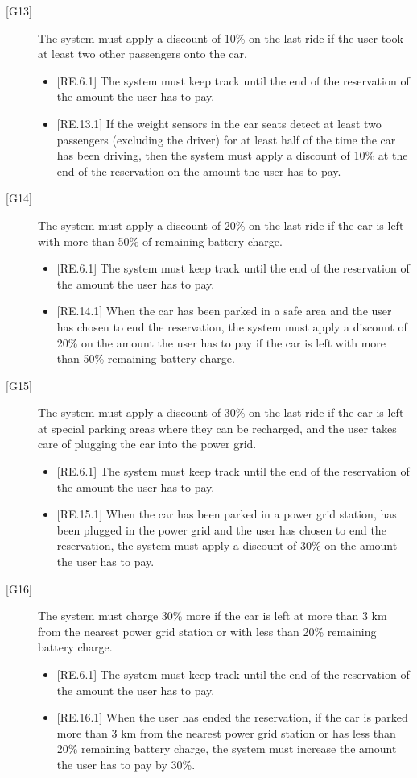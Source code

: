 \documentclass[english]{article}
\begin{document}
\begin{description}
\item[{[G13]}]{The system must apply a discount of 10\% on the last ride if the user took at least two other passengers onto the car.
\begin{itemize}
	\item{[RE.6.1] The system must keep track until the end of the reservation of the amount the user has to pay.}
	\item{[RE.13.1] If the weight sensors in the car seats detect at least two passengers (excluding the driver) for at least half of the time the car has been driving, then the system must apply a discount of 10\% at the end of the reservation on the amount the user has to pay.}
\end{itemize}
}

\item[{[G14]}]{The system must apply a discount of 20\% on the last ride if the car is left with more than 50\% of remaining battery charge.
\begin{itemize}
	\item{[RE.6.1] The system must keep track until the end of the reservation of the amount the user has to pay.}
	\item{[RE.14.1] When the car has been parked in a safe area and the user has chosen to end the reservation, the system must apply a discount of 20\% on the amount the user has to pay if the car is left with more than 50\% remaining battery charge.}
\end{itemize}
}

\item[{[G15]}]{The system must apply a discount of 30\% on the last ride if the car is left at special parking areas where they can be recharged, and the user takes care of plugging the car into the power grid.
\begin{itemize}
	\item{[RE.6.1] The system must keep track until the end of the reservation of the amount the user has to pay.}
	\item{[RE.15.1] When the car has been parked in a power grid station, has been plugged in the power grid and the user has chosen to end the reservation, the system must apply a discount of 30\% on the amount the user has to pay.}
\end{itemize}
}

\item[{[G16]}]{The system must charge 30\% more if the car is left at more than 3 km from the nearest power grid station or with less than 20\% remaining battery charge.
\begin{itemize}
	\item{[RE.6.1] The system must keep track until the end of the reservation of the amount the user has to pay.}
	\item{[RE.16.1] When the user has ended the reservation, if the car is parked more than 3 km from the nearest power grid station or has less than 20\% remaining battery charge, the system must increase the amount the user has to pay by 30\%.}
\end{itemize}
}

\end{description}
\end{document}
